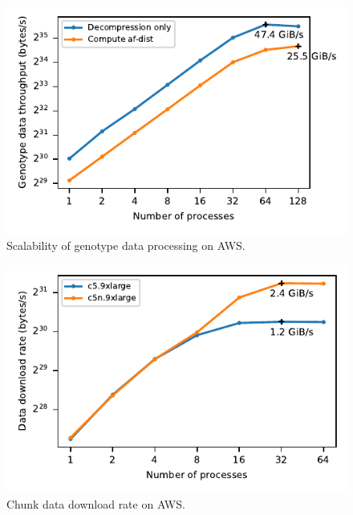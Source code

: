 \documentclass[a4paper,num-refs]{oup-contemporary}
\begin{document}
\begin{figure}[h]
\includegraphics{figures/s3-throughput}
\caption{Scalability of genotype data processing on AWS.
\label{fig-s3-throughput}}
\end{figure}

\begin{figure}[h]
\includegraphics{figures/s3-network-throughput}
\caption{Chunk data download rate on AWS.
\label{fig-s3-network-throughput}}
\end{figure}
\end{document}
